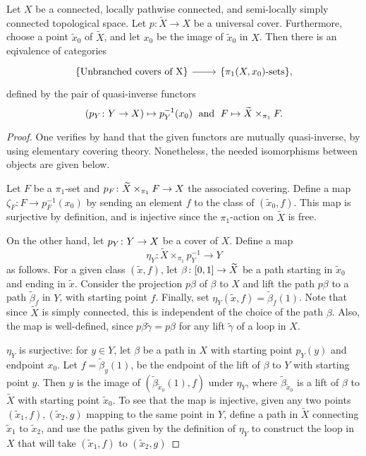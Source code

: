 \begin{prop}

 Let $X$ be a connected, locally pathwise connected, and semi-locally simply connected topological space. Let $p:\widetilde{X}\to X$ be a universal cover. Furthermore, choose a point $\widetilde{x}_0$ of $\widetilde{X}$, and let $x_0$ be the image of $\widetilde{x}_0$ in $X$. Then there is an eqivalence of categories
 \[
 \begin{tikzcd}
  \{\text{Unbranched covers of X}\} \arrow{r} & \{\pi_1(X,x_0)\text{-sets}\},
 \end{tikzcd}
 \]
 defined by the pair of quasi-inverse functors \[(p_Y\colon Y\to X) \mapsto p^{-1}_Y(x_0)\;\text{ and }\;F \mapsto \widetilde{X} \times_{\pi_1} F.\]
\end{prop}
\begin{proof}
 One verifies by hand that the given functors are mutually quasi-inverse, by using elementary covering theory. Nonetheless, the needed isomorphisms between objects are given below.
 
 Let $F$ be a $\pi_1$-set and $p_F\colon \widetilde{X} \times_{\pi_1} F \to X$ the associated covering. Define a map $\zeta_F: F\to p_F^{-1}(x_0)$ by sending an element $f$ to the class of $(\widetilde{x}_0,f)$. This map is surjective by definition, and is injective since the $\pi_1$-action on $\widetilde{X}$ is free.
 
 On the other hand, let $p_Y\colon Y\to X$ be a cover of $X$. Define a map \[\eta_Y: \widetilde{X}\times_{\pi_1} p_Y^{-1} \to Y\] as follows. For a given class $(\widetilde{x},f)$, let $\beta\colon [0,1] \to \widetilde{X}$ be a path starting in $\widetilde{x}_0$ and ending in $\widetilde{x}$. Consider the projection $p\beta$ of $\beta$ to $X$ and lift the path $p\beta$ to a path $\widetilde{\beta}_f$ in $Y$, with starting point $f$. Finally, set $\eta_Y(\widetilde{x},f)=\widetilde{\beta}_f(1)$. Note that since $\widetilde{X}$ is simply connected, this is independent of the choice of the path $\beta$. Also, the map is well-defined, since $p\beta \widetilde{\gamma} = p\beta$ for any lift $\widetilde{\gamma}$ of a loop in $X$.
 
 $\eta_Y$ is surjective: for $y \in Y$, let $\beta$ be a path in $X$ with starting point $p_Y(y)$ and endpoint $x_0$. Let $f=\widetilde{\beta}_{y}(1)$, be the endpoint of the lift of $\beta$ to $Y$ with starting point $y$. Then $y$ is the image of $(\widetilde{\beta}_{\widetilde{x}_0}(1),f)$ under $\eta_Y$, where $\widetilde{\beta}_{\widetilde{x}_0}$ is a lift of $\beta$ to $\widetilde{X}$ with starting point $\widetilde{x}_0$. To see that the map is injective, given any two points $(\widetilde{x}_1,f),(\widetilde{x}_2,g)$ mapping to the same point in $Y$, define a path in $\widetilde{X}$ connecting $\widetilde{x}_1$ to $\widetilde{x}_2$, and use the paths given by the definition of $\eta_Y$ to construct the loop in $X$ that will take $(\widetilde{x}_1,f)$ to $(\widetilde{x}_2,g)$
\end{proof}

